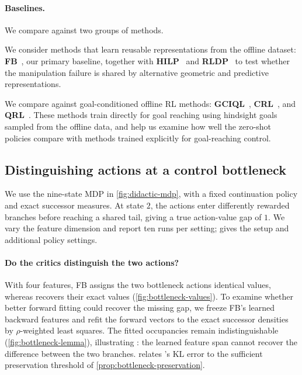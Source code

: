 \paragraph{Baselines.}
We compare against two groups of methods.
\begin{inparaenum}
    \item We consider methods that learn reusable representations from the offline dataset: \textbf{FB}~\citep{touati-neurips21a,touati-iclr23b}, our primary baseline, together with \textbf{HILP}~\citep{park-iclr24a} and \textbf{RLDP}~\citep{jajoo-iclr26a} to test whether the manipulation failure is shared by alternative geometric and predictive representations. 
    \item We compare against goal-conditioned offline RL methods: \textbf{GCIQL}~\cite{kostrikov-iclr22a,park-iclr25b}, \textbf{CRL}~\cite{eysenbach-neurips22a}, and \textbf{QRL}~\cite{wang-icml23a}. 
    These methods train directly for goal reaching using hindsight goals sampled from the offline data, and help us examine how well the zero-shot policies compare with methods trained explicitly for goal-reaching control. 
\end{inparaenum}

\subsection{Distinguishing actions at a control bottleneck}
\label{sec:exp-didactic}

We use the nine-state MDP in \cref{fig:didactic-mdp}, with a fixed continuation policy and exact successor measures. 
At state $2$, the actions enter differently rewarded branches before reaching a shared tail, giving a true action-value gap of $1$.
We vary the feature dimension and report ten runs per setting;  gives the setup and additional policy settings.

\paragraph{Do the critics distinguish the two actions?}
With four features, FB assigns the two bottleneck actions identical values, whereas \name{} recovers their exact values (\cref{fig:bottleneck-values}).
To examine whether better forward fitting could recover the missing gap, we freeze FB's learned backward features and refit the forward vectors to the exact successor densities by $\rho$-weighted least squares.
The fitted occupancies remain indistinguishable (\cref{fig:bottleneck-lemma}), illustrating : the learned feature span cannot recover the difference between the two branches.
 relates \name{}'s KL error to the sufficient preservation threshold of \cref{prop:bottleneck-preservation}.

